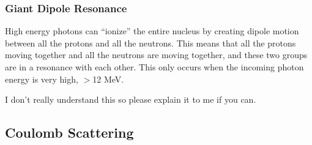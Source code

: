\documentclass[letter]{article}
\begin{document}
\subsubsection{Giant Dipole Resonance}
High energy photons can ``ionize'' the entire nucleus by
  creating dipole motion between all the protons and all the
  neutrons. This means that all the protons moving together and all
  the neutrons are moving together, and these two groups are in a
  resonance with each other. This only occurs when the incoming photon energy is very
  high, $>$12 MeV.~\cite[Lec 25]{lecture}

\vspace{10pt}
I don't really understand this so please explain it to me if you can.

\subsection{Coulomb Scattering}
\end{document}
